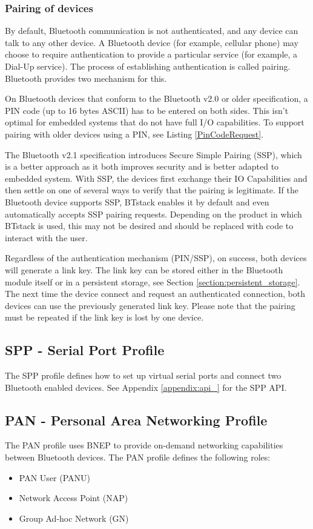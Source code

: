 \subsubsection{Pairing of devices}
By default, Bluetooth communication is not authenticated, and any device can talk to any other device. A Bluetooth device (for example, cellular phone) may choose to require authentication to provide a particular service (for example, a Dial-Up service). The process of establishing authentication is called pairing. Bluetooth provides two mechanism for this.

On Bluetooth devices that conform to the Bluetooth v2.0 or older specification, a PIN code (up to 16 bytes ASCII) has to be entered on both sides. This isn't optimal for embedded systems that do not have full I/O capabilities. To support pairing with older devices using a PIN, see Listing \ref{PinCodeRequest}.

The Bluetooth v2.1 specification introduces Secure Simple Pairing (SSP), which is a better approach as it both improves security and is better adapted to embedded system. With SSP, the devices first exchange their IO Capabilities and then settle on one of several ways to verify that the pairing is legitimate. If the Bluetooth device supports SSP, BTstack enables it by default and even automatically accepts SSP pairing requests. Depending on the product in which BTstack is used, this may not be desired and should be replaced with code to interact with the user.

Regardless of the authentication mechanism (PIN/SSP), on success, both devices will generate a link key. The link key can be stored either in the Bluetooth module itself or in a persistent storage, see Section \ref{section:persistent_storage}. The next time the device connect and request an authenticated connection, both devices can use the previously generated link key. Please note that the pairing must be repeated if the link key is lost by one device.




\subsection{SPP - Serial Port Profile}
The SPP profile defines how to set up virtual serial ports and connect two Bluetooth enabled devices. See Appendix \ref{appendix:api_} for the SPP API.


\subsection{PAN -  Personal Area Networking Profile}
The PAN profile uses BNEP to provide on-demand networking capabilities between Bluetooth devices. The PAN profile defines the following roles:
\begin{itemize}
\item PAN User (PANU)
\item Network Access Point (NAP)
\item Group Ad-hoc Network (GN)
\end{itemize}

